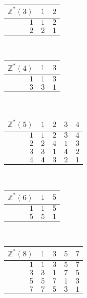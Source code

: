 \documentclass[oneside]{article}
\newcommand\bbZ{\mathbb{Z}}
\begin{document}
  \begin{center}
    \begin{tabular} {r | c c}
      $\bbZ^*(3)$ & $1$ & $2$ \\
      \hline
      $1$ & $1$ & $2$ \\
      $2$ & $2$ & $1$
    \end{tabular}\\[20pt]

    \begin{tabular} {r | c c}
      $\bbZ^*(4)$ & $1$ & $3$ \\
      \hline
      $1$ & $1$ & $3$ \\
      $3$ & $3$ & $1$
    \end{tabular}\\[20pt]

    \begin{tabular} {r | c c c c}
      $\bbZ^*(5)$ & $1$ & $2$ & $3$ & $4$ \\
      \hline
      $1$ & $1$ & $2$ & $3$ & $4$ \\
      $2$ & $2$ & $4$ & $1$ & $3$ \\
      $3$ & $3$ & $1$ & $4$ & $2$ \\
      $4$ & $4$ & $3$ & $2$ & $1$ \\
    \end{tabular}\\[20pt]

    \begin{tabular} {r | c c}
      $\bbZ^*(6)$ & $1$ & $5$ \\
      \hline
      $1$ & $1$ & $5$ \\
      $5$ & $5$ & $1$
    \end{tabular}\\[20pt]

    \begin{tabular} {r | c c c c}
      $\bbZ^*(8)$ & $1$ & $3$ & $5$ & $7$ \\
      \hline
      $1$ & $1$ & $3$ & $5$ & $7$ \\
      $3$ & $3$ & $1$ & $7$ & $5$ \\
      $5$ & $5$ & $7$ & $1$ & $3$ \\
      $7$ & $7$ & $5$ & $3$ & $1$ \\
    \end{tabular}\\[20pt]


\end{center}
\end{document}
